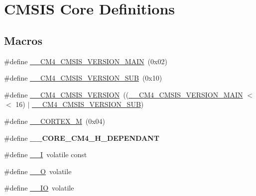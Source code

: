 \hypertarget{group___c_m_s_i_s__core__definitions}{}\section{C\+M\+S\+IS Core Definitions}
\label{group___c_m_s_i_s__core__definitions}
\subsection*{Macros}
\begin{DoxyCompactItemize}
\item 
\#define \hyperlink{group___c_m_s_i_s__core__definitions_ga90ffc8179476f80347379bfe29639edc}{\+\_\+\+\_\+\+C\+M4\+\_\+\+C\+M\+S\+I\+S\+\_\+\+V\+E\+R\+S\+I\+O\+N\+\_\+\+M\+A\+IN}~(0x02)
\item 
\#define \hyperlink{group___c_m_s_i_s__core__definitions_gafc7392964da961a44e916fcff7add532}{\+\_\+\+\_\+\+C\+M4\+\_\+\+C\+M\+S\+I\+S\+\_\+\+V\+E\+R\+S\+I\+O\+N\+\_\+\+S\+UB}~(0x10)
\item 
\#define \hyperlink{group___c_m_s_i_s__core__definitions_gacb6f5d2c3271c95d0a02fd06723af25d}{\+\_\+\+\_\+\+C\+M4\+\_\+\+C\+M\+S\+I\+S\+\_\+\+V\+E\+R\+S\+I\+ON}~((\hyperlink{group___c_m_s_i_s__core__definitions_ga90ffc8179476f80347379bfe29639edc}{\+\_\+\+\_\+\+C\+M4\+\_\+\+C\+M\+S\+I\+S\+\_\+\+V\+E\+R\+S\+I\+O\+N\+\_\+\+M\+A\+IN} $<$$<$ 16) $\vert$ \hyperlink{group___c_m_s_i_s__core__definitions_gafc7392964da961a44e916fcff7add532}{\+\_\+\+\_\+\+C\+M4\+\_\+\+C\+M\+S\+I\+S\+\_\+\+V\+E\+R\+S\+I\+O\+N\+\_\+\+S\+UB})
\item 
\#define \hyperlink{group___c_m_s_i_s__core__definitions_ga63ea62503c88acab19fcf3d5743009e3}{\+\_\+\+\_\+\+C\+O\+R\+T\+E\+X\+\_\+M}~(0x04)
\item 
\mbox{\label{group___c_m_s_i_s__core__definitions_ga65104fb6a96df4ec7f7e72781b561060}} 
\#define {\bfseries \+\_\+\+\_\+\+C\+O\+R\+E\+\_\+\+C\+M4\+\_\+\+H\+\_\+\+D\+E\+P\+E\+N\+D\+A\+NT}
\item 
\#define \hyperlink{group___c_m_s_i_s__core__definitions_gaf63697ed9952cc71e1225efe205f6cd3}{\+\_\+\+\_\+I}~volatile const
\item 
\#define \hyperlink{group___c_m_s_i_s__core__definitions_ga7e25d9380f9ef903923964322e71f2f6}{\+\_\+\+\_\+O}~volatile
\item 
\#define \hyperlink{group___c_m_s_i_s__core__definitions_gaec43007d9998a0a0e01faede4133d6be}{\+\_\+\+\_\+\+IO}~volatile
\end{DoxyCompactItemize}


